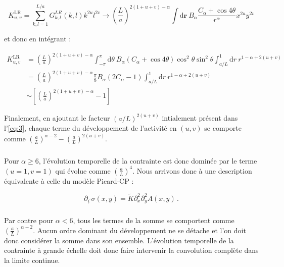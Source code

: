 \begin{equation}
    K^\text{LR}_{u,v} = \sum_{k,l = 1}^{L/a}G_{k,l}^{LR}(k,l)k^{2u}l^{2v}
    \rightarrow \left(\frac{L}{a}\right)^{2(1+u+v)-\alpha}\int \mathrm{d}\mathbf{r}~B_\alpha\frac{C_\alpha+\cos 4\theta}{r^\alpha}x^{2u}y^{2v}
\end{equation}

\noindent et donc en intégrant :

\begin{equation}
\begin{aligned}
    K^\text{LR}_{u,v} &= \left(\frac{L}{a}\right)^{2(1+u+v)-\alpha}\int_{-\pi}^\pi \mathrm{d}\theta~B_\alpha(C_\alpha+\cos 4\theta)\cos^2\theta\sin^2\theta \int_{a/L}^1 \mathrm{d}r ~ r^{1-\alpha+2(u+v)}\\
    &=\left(\frac{L}{a}\right)^{2(1+u+v)-\alpha}\frac{\pi}{8}B_\alpha(2C_\alpha-1)\int_{a/L}^1 \mathrm{d}r ~ r^{1-\alpha+2(u+v)}\\
    &\sim \left[ \left(\frac{L}{a}\right)^{2(1+u+v)-\alpha}-1 \right]
    \label{eq:eval:I}
\end{aligned}
\end{equation}

\noindent Finalement, en ajoutant le facteur $(a/L)^{2(u+v)}$ intialement présent dans l'\autoref{eq:3}, chaque terme du développement de l'activité en $(u,v)$ se comporte comme $\left(\frac{a}{L}\right)^{\alpha-2}-\left( \frac{a}{L} \right)^{2(u+v)}$.

\subparagraph{}Pour $\alpha \geq 6$, l'évolution temporelle de la contrainte est donc dominée par le terme $(u=1,v=1)$ qui évolue comme $\left( \frac{a}{L} \right)^4$. Nous arrivons donc à une description équivalente à celle du modèle Picard-CP :

\begin{equation}
    \partial_{t^\prime}\sigma (x,y) = \tilde{K}\partial_x^{2}\partial_y^{2}A(x, y)\, .
    \label{eq:evol:sigma:Classa6}
\end{equation}

\subparagraph{}Par contre pour $\alpha < 6$, tous les termes de la somme se comportent comme $\left( \frac{a}{L} \right)^{\alpha-2}$. Aucun ordre dominant du développement ne se détache et l'on doit donc considérer la somme dans son ensemble. L'évolution temporelle de la contrainte à grande échelle doit donc faire intervenir la convolution complète dans la limite continue.

